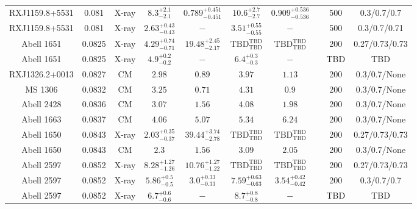 \begin{table}
\begin{tabular}{cccccccccc}
RXJ1159.8+5531 & 0.081 & X-ray & ${8.3}^{+2.1}_{-2.1}$ & ${0.789}^{+0.451}_{-0.451}$ & ${10.6}^{+2.7}_{-2.7}$ & ${0.909}^{+0.536}_{-0.536}$ & \citet{GA06.1} & 500 & 0.3/0.7/0.7 \\
RXJ1159.8+5531 & 0.081 & X-ray & ${2.63}^{+0.43}_{-0.43}$ & ${-}^{}_{}$ & ${3.51}^{+0.55}_{-0.55}$ & ${-}^{}_{}$ & \citet{VI05.1} & 500 & 0.3/0.7/0.71 \\
Abell 1651 & 0.0825 & X-ray & ${4.29}^{+0.74}_{-0.71}$ & ${19.48}^{+2.45}_{-2.17}$ & ${\mathrm{TBD}}^{\mathrm{TBD}}_{\mathrm{TBD}}$ & ${\mathrm{TBD}}^{\mathrm{TBD}}_{\mathrm{TBD}}$ & \citet{BA14.1} & 200 & 0.27/0.73/0.73 \\
Abell 1651 & 0.0825 & X-ray & ${4.9}^{+0.2}_{-0.2}$ & ${-}^{}_{}$ & ${6.4}^{+0.3}_{-0.3}$ & ${-}^{}_{}$ & \citet{XU01.1} & TBD & TBD \\
RXJ1326.2+0013 & 0.0827 & CM & ${2.98}^{}_{}$ & ${0.89}^{}_{}$ & ${3.97}^{}_{}$ & ${1.13}^{}_{}$ & \citet{RI06.1} & 200 & 0.3/0.7/None \\
MS 1306 & 0.0832 & CM & ${3.25}^{}_{}$ & ${0.71}^{}_{}$ & ${4.31}^{}_{}$ & ${0.9}^{}_{}$ & \citet{RI06.1} & 200 & 0.3/0.7/None \\
Abell 2428 & 0.0836 & CM & ${3.07}^{}_{}$ & ${1.56}^{}_{}$ & ${4.08}^{}_{}$ & ${1.98}^{}_{}$ & \citet{RI06.1} & 200 & 0.3/0.7/None \\
Abell 1663 & 0.0837 & CM & ${4.06}^{}_{}$ & ${5.07}^{}_{}$ & ${5.34}^{}_{}$ & ${6.24}^{}_{}$ & \citet{RI06.1} & 200 & 0.3/0.7/None \\
Abell 1650 & 0.0843 & X-ray & ${2.03}^{+0.35}_{-0.37}$ & ${39.44}^{+3.74}_{-2.78}$ & ${\mathrm{TBD}}^{\mathrm{TBD}}_{\mathrm{TBD}}$ & ${\mathrm{TBD}}^{\mathrm{TBD}}_{\mathrm{TBD}}$ & \citet{BA14.1} & 200 & 0.27/0.73/0.73 \\
Abell 1650 & 0.0843 & CM & ${2.3}^{}_{}$ & ${1.56}^{}_{}$ & ${3.09}^{}_{}$ & ${2.05}^{}_{}$ & \citet{RI06.1} & 200 & 0.3/0.7/None \\
Abell 2597 & 0.0852 & X-ray & ${8.28}^{+1.27}_{-1.26}$ & ${10.76}^{+1.27}_{-1.22}$ & ${\mathrm{TBD}}^{\mathrm{TBD}}_{\mathrm{TBD}}$ & ${\mathrm{TBD}}^{\mathrm{TBD}}_{\mathrm{TBD}}$ & \citet{BA14.1} & 200 & 0.27/0.73/0.73 \\
Abell 2597 & 0.0852 & X-ray & ${5.86}^{+0.5}_{-0.5}$ & ${3.0}^{+0.33}_{-0.33}$ & ${7.59}^{+0.63}_{-0.63}$ & ${3.54}^{+0.42}_{-0.42}$ & \citet{PO05.1} & 200 & 0.3/0.7/0.7 \\
Abell 2597 & 0.0852 & X-ray & ${6.7}^{+0.6}_{-0.6}$ & ${-}^{}_{}$ & ${8.7}^{+0.8}_{-0.8}$ & ${-}^{}_{}$ & \citet{XU01.1} & TBD & TBD \\

\end{tabular}
\end{table}
